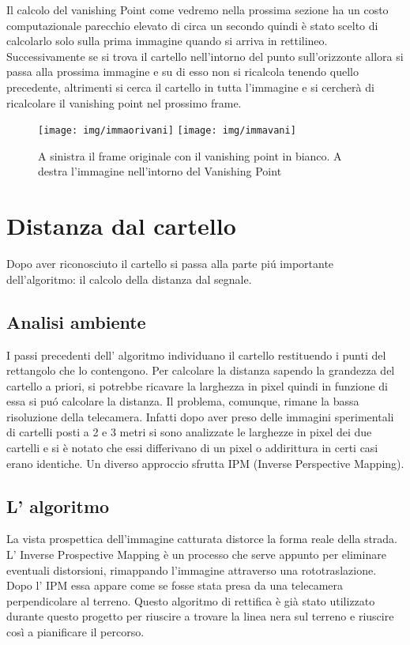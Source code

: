 		Il calcolo del vanishing Point come vedremo nella prossima sezione ha un costo computazionale parecchio elevato di circa un secondo quindi è stato scelto di calcolarlo solo sulla prima immagine quando si arriva in rettilineo. Successivamente se si trova il cartello nell'intorno del punto sull'orizzonte allora si passa alla prossima immagine e su di esso non si ricalcola tenendo quello precedente, altrimenti si cerca il cartello in tutta l'immagine e si cercherà di ricalcolare il vanishing point nel prossimo frame.

		\begin{figure}[!ht]
			\centering
			\texttt{[image: img/immaorivani]}
			\texttt{[image: img/immavani]}
			\caption[Esempio vanishin Point calcolato]{A sinistra il frame originale con il vanishing point in bianco. A destra l'immagine nell'intorno del Vanishing Point}
		\end{figure}

\section{Distanza dal cartello}
	
	Dopo aver riconosciuto il cartello si passa alla parte pi\'u importante dell'algoritmo: il calcolo della distanza dal segnale.

	\subsection{Analisi ambiente}

		I passi precedenti dell' algoritmo individuano il cartello restituendo i punti del rettangolo che lo contengono. Per calcolare la distanza sapendo la grandezza del cartello a priori, si potrebbe ricavare la larghezza in pixel quindi in funzione di essa si pu\'o calcolare la distanza. Il problema, comunque, rimane la bassa risoluzione della telecamera. Infatti dopo aver preso delle immagini sperimentali di cartelli posti a 2 e 3 metri si sono analizzate le larghezze in pixel dei due cartelli e si è notato che essi differivano di un pixel o addirittura in certi casi erano identiche. Un diverso approccio sfrutta IPM (Inverse Perspective Mapping).
		
	\subsection{L' algoritmo}

		La vista prospettica dell'immagine catturata distorce la forma reale della strada. L' Inverse Prospective Mapping è un processo che serve appunto per eliminare eventuali distorsioni, rimappando l'immagine attraverso una rototraslazione. Dopo l' IPM essa appare come se fosse stata presa da una telecamera perpendicolare al terreno. Questo algoritmo di rettifica è già stato utilizzato durante questo progetto\cite{Rettifica} per riuscire a trovare la linea nera sul terreno e riuscire così a pianificare il percorso.

